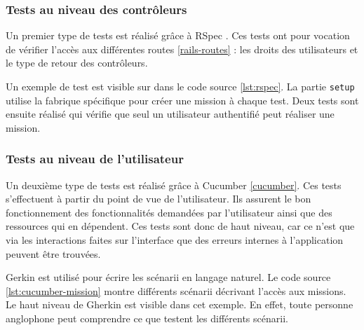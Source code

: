 \subsubsection{Tests au niveau des contrôleurs}
Un premier type de tests est réalisé grâce à RSpec \cite{rspec}. Ces tests ont pour vocation de vérifier l'accès aux différentes routes \ref{rails-routes} : les droits des utilisateurs et le type de retour des contrôleurs.

Un exemple de test est visible sur dans le code source \ref{lst:rspec}. La partie \texttt{setup} utilise la fabrique spécifique pour créer une \gls{mission} à chaque test. Deux tests sont ensuite réalisé qui vérifie que seul un utilisateur authentifié peut réaliser une \gls{mission}.

\begin{figure}

\end{figure}

\subsubsection{Tests au niveau de l'utilisateur}
Un deuxième type de tests est réalisé grâce à Cucumber \ref{cucumber}. Ces tests s'effectuent à partir du point de vue de l'utilisateur. Ils assurent le bon fonctionnement des fonctionnalités demandées par l'utilisateur ainsi que des ressources qui en dépendent. Ces tests sont donc de haut niveau, car ce n'est que via les interactions faites sur l'interface que des erreurs internes à l'application peuvent être trouvées.

\begin{figure}

\end{figure}

\begin{figure}

\end{figure}

Gerkin est utilisé pour écrire les scénarii en langage naturel.
Le code source \ref{lst:cucumber-mission} montre différents scénarii décrivant l'accès aux \glspl{mission}. Le haut niveau de Gherkin est visible dans cet exemple. En effet, toute personne anglophone peut comprendre ce que testent les différents scénarii.


